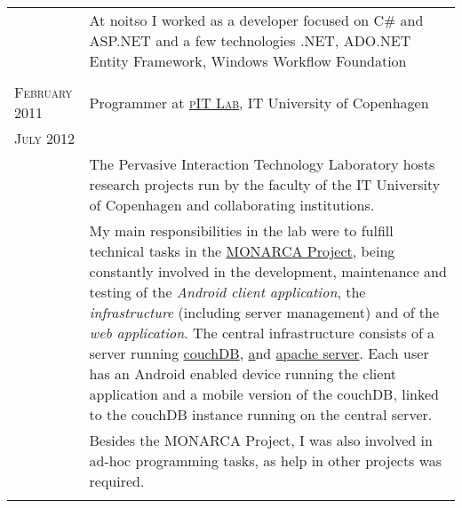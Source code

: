 \documentclass[a4paper,10pt]{article}
\begin{document}
\begin{longtable}{p{2.5cm}|p{11cm}}
& \footnotesize{At noitso I worked as a developer focused on C\# and ASP.NET and a few technologies .NET, ADO.NET Entity
Framework, Windows Workflow Foundation}\\
\multicolumn{2}{c}{} \\ 

 \raggedleft \textsc{February 2011} & Programmer at
 \textsc{\href{http://www.itu.dk/pit/}{pIT Lab}}, IT University of Copenhagen
 \\\raggedleft \textsc{July 2012}\\& 
 \footnotesize{The Pervasive Interaction Technology Laboratory hosts research
 projects run by the faculty of the IT University of Copenhagen and
 collaborating institutions.}\\

 & \footnotesize{My main responsibilities in the lab were to fulfill technical
 tasks in the \href{http://www.monarca-project.eu/}{MONARCA Project}, being constantly involved in the  development, maintenance and testing of the \emph{Android client application}, the \emph{infrastructure} (including server management) and of the \emph{web application}. The central infrastructure consists of a server running \href{http://couchdb.apache.org}{couchDB}, \href{http://www.joomla.org} and \href{http://httpd.apache.org}{apache server}. Each user has an Android enabled device running the client application and a mobile version of the couchDB, linked to the couchDB instance running on the central server.}\\

& \footnotesize{Besides the MONARCA Project, I was also involved in ad-hoc programming tasks, as help in other projects was required.}\\
\multicolumn{2}{c}{} \\ 


\end{longtable}
\end{document}
